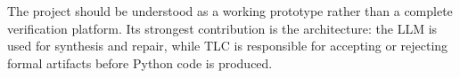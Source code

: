 \documentclass[11pt]{article}
\begin{document}
The project should be understood as a working prototype rather than a complete
verification platform. Its strongest contribution is the architecture: the LLM
is used for synthesis and repair, while TLC is responsible for accepting or
rejecting formal artifacts before Python code is produced.



\end{document}
